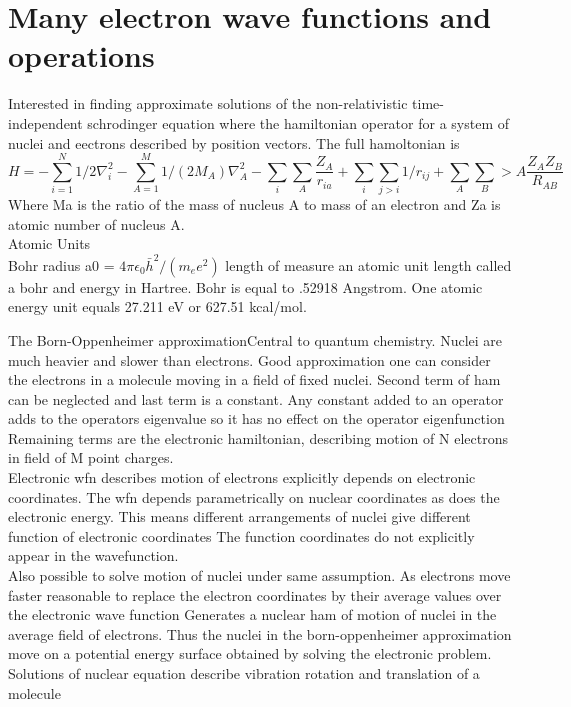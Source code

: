 \documentclass[10pt, draft]{article}
\begin{document}
\section{Many electron wave functions and operations}
Interested in finding approximate solutions of the non-relativistic time-independent schrodinger equation where the hamiltonian operator for a system of nuclei and eectrons described by position vectors.  The full hamoltonian is 
\[ H = - \sum_{i=1}^N 1/2 \nabla_i^2 - \sum_{A=1}^M 1/(2M_A)\nabla_A^2 - \sum_i \sum_A \frac{Z_A}{r_{ia}} + \sum_i \sum_{j>i} 1/r_{ij} + \sum_A \sum_B>A \frac{Z_A Z_B}{R_{AB}}\]
Where Ma is the ratio of the mass of nucleus A to mass of an electron and Za is atomic number of nucleus A.  \\
Atomic Units\\
Bohr radius a0 = $4\pi \epsilon_0 \bar{h}^2/(m_e e^2)$ length of measure an atomic unit length called a bohr and energy in Hartree.  Bohr is equal to .52918 Angstrom.  One atomic energy unit equals 27.211 eV or 627.51 kcal/mol.\linebreak[1]

The Born-Oppenheimer approximation\linebreak[1]
Central to quantum chemistry.  Nuclei are much heavier and slower than electrons.  Good approximation one can consider the electrons in a molecule moving in a field of fixed nuclei.  Second term of ham can be neglected and last term is a constant.  Any constant added to an operator adds to the operators eigenvalue so it has no effect on the operator eigenfunction  Remaining terms are the electronic hamiltonian, describing motion of N electrons in field of M point charges.\\

Electronic wfn describes motion of electrons explicitly depends on electronic coordinates. The wfn depends parametrically on nuclear coordinates as does the electronic energy. This means different arrangements of nuclei give different function of electronic coordinates The function coordinates do not explicitly appear in the wavefunction.  \\
Also possible to solve motion of nuclei under same assumption.  As electrons move faster reasonable to replace the electron coordinates by their average values over the electronic wave function  Generates a nuclear ham of motion of nuclei in the average field of electrons.  Thus the nuclei in the born-oppenheimer approximation move on a potential energy surface obtained by solving the electronic problem.  Solutions of nuclear equation describe vibration rotation and translation of a molecule \linebreak[1]
\end{document}
